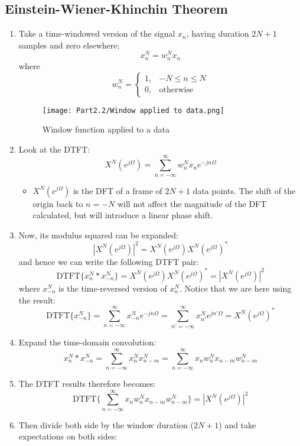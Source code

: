 \documentclass[12pt]{article}
\newcommand{\summ}[2]{\sum_{#1}^{#2}}
\newcommand{\sumninfinf}{\summ{n=-\infty}{\infty}}
\newcommand{\win}{w_n^N}
\newcommand{\ejomg}{e^{j\Omega}}
\newcommand{\xdft}{X^N (\ejomg)}
\newcommand{\xproc}{x_n^N}
\newcommand{\xprocrev}{x_{-n}^N}
\newcommand{\DTFT}{\textrm{DTFT}}
\begin{document}
    \subsection{Einstein-Wiener-Khinchin Theorem}
    \begin{enumerate}
        \item Take a time-windowed version of the signal $x_n$, having duration $2N + 1$ samples and zero elsewhere;
        \[
        x_n^N = w_n^N x_n
        \]
        where 
        \[
        \win = \left\{ \begin{array}{cc}
            1, & -N\le n \le N \\
            0, & \textrm{otherwise}
        \end{array}\right.
        \]
        \begin{figure}[H]
            \centering
            \texttt{[image: Part2.2/Window applied to data.png]}
            \caption{Window function applied to a data}
        \end{figure}
        \item Look at the DTFT:
        \[
        X^N(e^{j\Omega}) = \sumninfinf \win x_n e^{-jn\Omega}
        \]
        \begin{itemize}
            \item $X^N(e^{j\Omega})$ is the DFT of a frame of $2N+1$ data points. The shift of the origin back to  $n=-N$ will not affect the magnitude of the DFT calculated, but will introduce a linear phase shift.
        \end{itemize}
        \item Now, its modulus squared can be expanded:
        \[
        |X^N(e^{j\Omega})|^2 = \xdft \xdft^*
        \]
        and hence we can write the following DTFT pair:
        \[
        \DTFT\{\xproc * \xprocrev \} = \xdft \xdft^* = |X^N(e^{j\Omega})|^2
        \]
        where $\xprocrev$ is the time-reversed version of $\xproc$. Notice that we are here using the result:
        \[
        \DTFT\{\xprocrev \} =\sumninfinf \xprocrev e^{-jn\Omega} = \sum_{n'=-\infty}^\infty x_{n'}^Ne^{jn'\Omega} =\xdft^*
        \]
        \item Expand the time-domain convolution:
        \[
        \xproc * \xprocrev = \sumninfinf \xproc x_{n-m}^N = \sumninfinf x_n \win x_{n-m} w_{n-m}^N
        \]
        \item The DTFT results therefore becomes:
        \[
        \DTFT\{\sumninfinf x_n \win x_{n-m} w_{n-m}^N \} = |X^N(e^{j\Omega})|^2
        \]
        \item Then divide both side by the window duration ($2N+1$) and take expectations on both sides:

\end{enumerate}
\end{document}
